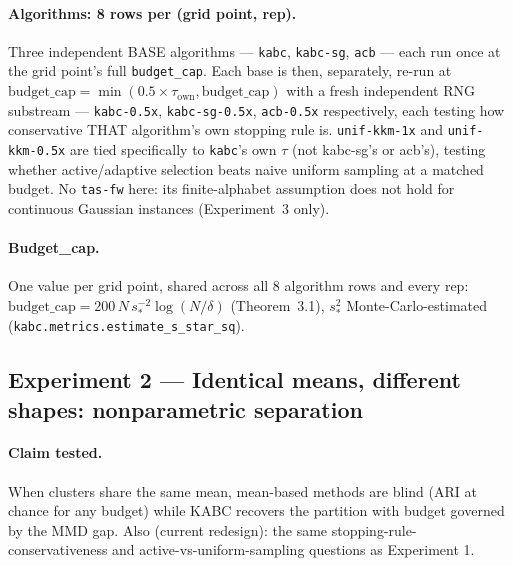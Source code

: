 \documentclass[11pt]{article}
\begin{document}
\paragraph{Algorithms: 8 rows per (grid point, rep).} Three independent BASE
algorithms --- \texttt{kabc}, \texttt{kabc-sg}, \texttt{acb} --- each run
once at the grid point's full \texttt{budget\_cap}. Each base is then,
separately, re-run at $\text{budget\_cap} = \min(0.5 \times \tau_{\text{own}},
\text{budget\_cap})$ with a fresh independent RNG substream ---
\texttt{kabc-0.5x}, \texttt{kabc-sg-0.5x}, \texttt{acb-0.5x} respectively,
each testing how conservative THAT algorithm's own stopping rule is.
\texttt{unif-kkm-1x} and \texttt{unif-kkm-0.5x} are tied specifically to
\texttt{kabc}'s own $\tau$ (not kabc-sg's or acb's), testing whether
active/adaptive selection beats naive uniform sampling at a matched budget.
No \texttt{tas-fw} here: its finite-alphabet assumption does not hold for
continuous Gaussian instances (Experiment~3 only).

\paragraph{Budget\_cap.} One value per grid point, shared across all 8
algorithm rows and every rep: $\text{budget\_cap} = 200\, N\, s_*^{-2}
\log(N/\delta)$ (Theorem~3.1), $s_*^2$ Monte-Carlo-estimated
(\texttt{kabc.metrics.estimate\_s\_star\_sq}).

\subsection{Experiment 2 --- Identical means, different shapes: nonparametric separation}
\label{sec:setup-exp2}

\paragraph{Claim tested.} When clusters share the same mean, mean-based
methods are blind (ARI at chance for any budget) while KABC recovers the
partition with budget governed by the MMD gap. Also (current redesign): the
same stopping-rule-conservativeness and active-vs-uniform-sampling questions
as Experiment 1.
\end{document}
